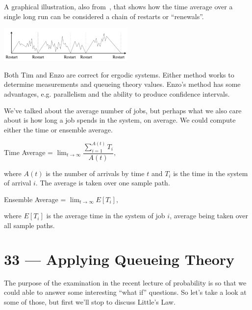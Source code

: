 \documentclass[a4paper]{report}
\begin{document}
A graphical illustration, also from~\cite{pmd}, that shows how the time average over a single long run can be considered a chain of restarts or ``renewals''.

\begin{center}
	\includegraphics[width=0.5\textwidth]{images/systemrestart.png}
\end{center}

Both Tim and Enzo are correct for ergodic systems. Either method works to determine measurements and queueing theory values. Enzo's method has some advantages, e.g. parallelism and the ability to produce confidence intervals.

We've talked about the average number of jobs, but perhaps what we also care about is how long a job spends in the system, on average. We could compute either the time or ensemble average. 

\begin{center}
	Time Average = $\lim_{t\to\infty}\dfrac{\sum_{i=1}^{A(t)} T_{i}}{A(t)},$
\end{center}

where $A(t)$ is the number of arrivals by time $t$ and $T_{i}$ is the time in the system of arrival $i$. The average is taken over one sample path.

\begin{center}
	Ensemble Average = $\lim_{t\to\infty}E[T_{i}],$
\end{center}

where $E[T_{i}]$ is the average time in the system of job $i$, average being taken over all sample paths.









\chapter*{33 --- Applying Queueing Theory}


The purpose of the examination in the recent lecture of probability is so that we could able to answer some interesting ``what if'' questions. So let's take a look at some of those, but first we'll stop to discuss Little's Law.
\end{document}
